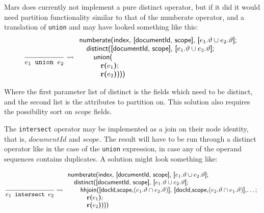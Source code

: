 Mars does currently not implement a pure \textsf{distinct} operator, but if it did it would need partition
functionality similar to that of the \textsf{numberate} operator, and a translation of \texttt{union} and \textbar
may have looked something like this:
\begin{equation*}
\frac{}{e_1 \mbox{\texttt{ union }} e_2} \leadsto
\begin{array}{l}
\mbox{\textsf{numberate(index, [documentId, scope], [}}e_1.\vartheta\cup e_2.\vartheta\mbox{\textsf{];}} \\ \quad
\mbox{\textsf{distinct([documentId, scope], [}}e_1.\vartheta\cup e_2.\vartheta\mbox{\textsf{];}} \\ \quad\quad
\mbox{\textsf{union(}} \\ \quad\quad\quad
\mbox{\textbf{r(}}e_1\mbox{\textbf{)};} \\ \quad\quad \quad
\mbox{\textbf{r(}}e_2\mbox{\textbf{)}\textsf{)))}}
\end{array}
\end{equation*}

Where the first parameter list of \textsf{distinct} is the fields which need to be distinct, and the second list
is the attributes to partition on. This solution also requires the possibility sort on $scope$ fields.

The \texttt{intersect} operator may be implemented as a join on their node identity, that is, $documentId$ and
$scope$. The result will have to be run through a \textsf{distinct} operator like in the case of the
\texttt{union} expression, in case any of the operand sequences contains duplicates. A solution might look
something like:

\begin{equation*}
\frac{}{e_1 \mbox{\texttt{ intersect }} e_2} \leadsto
\begin{array}{l}
\mbox{\textsf{numberate(index, [documentId, scope], [}}e_1.\vartheta\cup e_2.\vartheta\mbox{\textsf{];}} \\ \quad
\mbox{\textsf{distinct([documentId, scope], [}}e_1.\vartheta\cup e_2.\vartheta\mbox{\textsf{];}} \\ \quad\quad
\mbox{\textsf{hhjoin([docId,scope,}}(e_1.\vartheta\cap e_2.\vartheta)\mbox{\textsf{],
[docId,scope,}}(e_2.\vartheta\cap e_1.\vartheta) \mbox{\textsf{],\ldots;}} \\ \quad\quad \quad 
\mbox{\textbf{r(}}e_1\mbox{\textbf{)};} \\ \quad\quad \quad
\mbox{\textbf{r(}}e_2\mbox{\textbf{)}\textsf{)))}}
\end{array}
\end{equation*}


